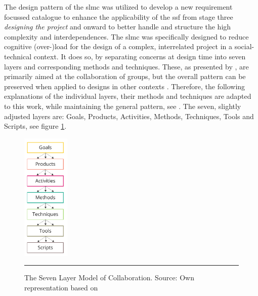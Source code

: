 The design pattern of the \acrshort{slmc} was utilized to develop a new requirement focussed catalogue to enhance the applicability of the \acrshort{ssf} from stage three \textit{designing the project} and onward to better handle and structure the high complexity and interdependences. The \acrshort{slmc} was specifically designed to reduce cognitive (over-)load for the design of a complex, interrelated project in a social-technical context. It does so, by separating concerns at design time into seven layers and corresponding methods and techniques. These, as presented by \textcite{briggsSevenLayerModelCollaboration2009}, are primarily aimed at the collaboration of groups, but the overall pattern can be preserved when applied to designs in other contexts \autocite{diggelenGroundedDesignDesign2009}. Therefore, the following explanations of the individual layers, their methods and techniques are adapted to this work, while maintaining the general pattern, see \textcite{briggsSevenLayerModelCollaboration2009}. The seven, slightly adjusted layers are: Goals, Products, Activities, Methods, Techniques, Tools and Scripts, see figure \ref{fig:meth_slmc}.\newline
\pagebreak
\begin{figure}
    \vspace{20pt}
    \centering
    \includegraphics[width=0.2\textwidth]{figures/2023_MA_methods_slmc_vertical_arrows.pdf}
    \rule{0.25\textwidth}{0.1pt}
    \caption[The Seven Layer Model of Collaboration]{The Seven Layer Model of Collaboration. Source: Own representation based on \textcite{briggsSevenLayerModelCollaboration2009}}
    \label{fig:meth_slmc}
    \vspace{20pt}
\end{figure}
